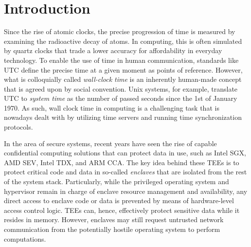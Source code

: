 \documentclass[sigplan,10pt]{acmart}
\begin{document}

\maketitle

\section{Introduction}

Since the rise of atomic clocks, the precise progression of time is measured by
examining the radioactive decay of atoms.
In computing, this is often simulated by quartz clocks that trade a lower
accuracy for affordability in everyday technology. To enable the
use of time in human communication, standards like \ac{UTC} define the precise
time at a given moment as points of reference. However, what is colloquially
called \emph{wall-clock time} is an inherently human-made concept that is agreed
upon by social convention. 
Unix systems, for example, translate \ac{UTC} to \emph{system time} as the number of passed seconds since the 1st of January 1970. 
As such, wall clock time in computing is a challenging task that is nowadays dealt with by utilizing time servers and running time synchronization protocols.%

In the area of secure systems, recent years have seen the rise of capable
confidential computing solutions that can protect data in use, such as Intel
SGX, AMD SEV, Intel TDX, and ARM CCA. The key idea behind these \acp{TEE}
is to protect critical code and data in so-called \emph{enclaves} that are
isolated from the rest of the system stack. Particularly, while the privileged
operating system and hypervisor remain in charge of enclave resource management
and availability, any direct access to enclave code or data is prevented by
means of hardware-level access control logic. 
\acp{TEE} can, hence, effectively protect sensitive data while it resides in memory. 
However, enclaves may still request untrusted network communication from the
potentially hostile operating system to perform computations.
\end{document}
